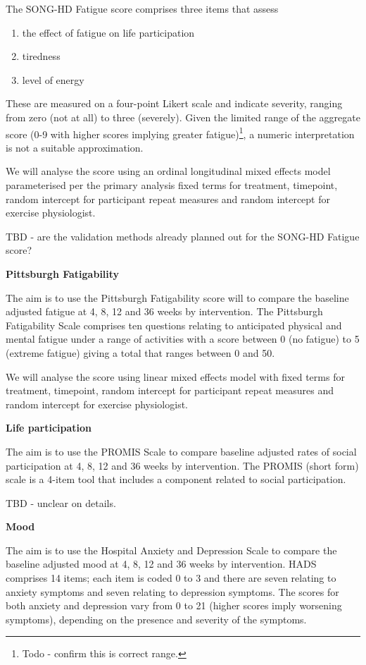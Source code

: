 \documentclass[
]{article}
\begin{document}
The SONG-HD Fatigue score comprises three items that assess
\begin{enumerate}
  \item the effect of fatigue on life participation
  \item tiredness
  \item level of energy
\end{enumerate}

These are measured on a four-point Likert scale and indicate severity, ranging from zero (not at all) to three (severely).
Given the limited range of the aggregate score (0-9 with higher scores implying greater fatigue)\footnote{Todo - confirm this is correct range.}, a numeric interpretation is not a suitable approximation.

We will analyse the score using an ordinal longitudinal mixed effects model parameterised per the primary analysis fixed terms for treatment, timepoint, random intercept for participant repeat measures and random intercept for exercise physiologist.

TBD - are the validation methods already planned out for the SONG-HD Fatigue score?

\textbf{Pittsburgh Fatigability}

The aim is to use the Pittsburgh Fatigability score will to compare the baseline adjusted fatigue at 4, 8, 12 and 36 weeks by intervention.
The Pittsburgh Fatigability Scale comprises ten questions relating to anticipated physical and mental fatigue under a range of activities with a score between 0 (no fatigue) to 5 (extreme fatigue) giving a total that ranges between 0 and 50.

We will analyse the score using linear mixed effects model with fixed terms for treatment, timepoint, random intercept for participant repeat measures and random intercept for exercise physiologist.

\textbf{Life participation}

The aim is to use the PROMIS Scale to compare baseline adjusted rates of social participation at 4, 8, 12 and 36 weeks by intervention.
The PROMIS (short form) scale is a 4-item tool that includes a component related to social participation.

TBD - unclear on details.

\textbf{Mood}

The aim is to use the Hospital Anxiety and Depression Scale to compare the baseline adjusted mood at 4, 8, 12 and 36 weeks by intervention.
HADS comprises 14 items; each item is coded 0 to 3 and there are seven relating to anxiety symptoms and seven relating to depression symptoms.
The scores for both anxiety and depression vary from 0 to 21 (higher scores imply worsening symptoms), depending on the presence and severity of the symptoms.
\end{document}
